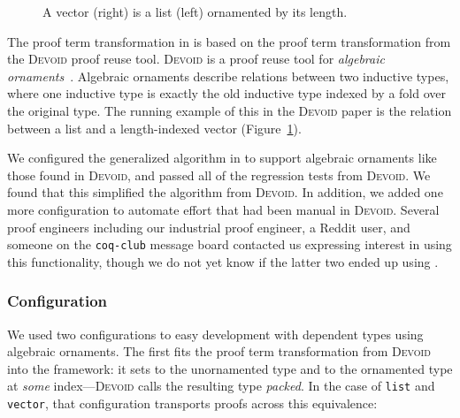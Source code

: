 \begin{figure}
\begin{minipage}{0.40\textwidth}
   
\end{minipage}
\hfill
\begin{minipage}{0.58\textwidth}
   
\end{minipage}
\caption{A vector (right) is a list (left) ornamented by its length.}
\label{fig:listtovect}
\end{figure}

The proof term transformation in \toolname is based on the proof term transformation from
the \textsc{Devoid} proof reuse tool.
\textsc{Devoid} is a proof reuse tool for \textit{algebraic ornaments}~\cite{mcbride}. Algebraic ornaments describe relations
between two inductive types, where one inductive type is exactly the old inductive type indexed by a fold
over the original type.
The running example of this in the \textsc{Devoid} paper is the relation between a list and a
length-indexed vector (Figure~\ref{fig:listtovect}).

We configured the generalized algorithm in \toolname to support algebraic ornaments like those found in \textsc{Devoid},
and passed all of the regression tests from \textsc{Devoid}.
We found that this simplified the algorithm from \textsc{Devoid}.
In addition, we added one more configuration to automate effort that had been manual in \textsc{Devoid}.
Several proof engineers including our industrial proof engineer, a Reddit user,
and someone on the \lstinline{coq-club} message board contacted us expressing interest in using this functionality,
though we do not yet know if the latter two ended up using \toolname. %

\subsubsection{Configuration}

We used two configurations to easy development with dependent types using algebraic ornaments.
The first fits the proof term transformation from \textsc{Devoid} into the \toolname framework:
it sets \A to the unornamented type and \B to the ornamented type at \textit{some} index---\textsc{Devoid}
calls the resulting type \textit{packed}.
In the case of \lstinline{list} and \lstinline{vector}, that configuration
transports proofs across this equivalence:

